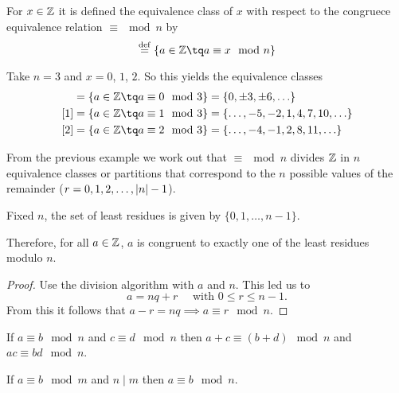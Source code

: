 \begin{defi}
    For $x\in\mathbb{Z}$ it is defined the equivalence class of $x$ with respect to the congruece equivalence
    relation $\equiv \mod n$ by
    \begin{equation}
        [x] \bydef \{a\in\Z\tq a\equiv x\mod n\}
    \end{equation}
\end{defi}

\begin{example}
    Take $n = 3$ and $x = 0$, $1$, $2$. So this yields the equivalence classes
    \begin{align}
        [0] &= \{a\in\Z\tq a\equiv 0\mod 3\} = \{ 0, \pm 3, \pm 6, \ldots\} \\
        [1] &= \{a\in\Z\tq a\equiv 1\mod 3\} = \{\ldots, -5, -2, 1, 4, 7, 10, \ldots\} \\
        [2] &= \{a\in\Z\tq a\equiv 2\mod 3\} = \{\ldots, -4, -1, 2, 8, 11, \ldots\}
    \end{align}
\end{example}

From the previous example we work out that $\equiv\mod n$ divides $\mathbb{Z}$ in $n$ equivalence classes or partitions that correspond to the $n$ possible values of the remainder ($r = 0, 1, 2,\ldots,\left\vert n \right\vert - 1$).

\begin{defi}
    Fixed $n$, the set of least residues is given by $\{0, 1, \ldots, n - 1\} $.
\end{defi}

Therefore, for all $a\in\mathbb{Z}$, $a$ is congruent to exactly one of the least residues modulo $n$.

\begin{proof}
    Use the division algorithm with $a$ and $n$. This led us to
    \begin{equation}
        a = nq + r\quad\textrm{ with } 0\leq r \leq n - 1.
    \end{equation}
    From this it follows that $a - r = nq\implies a\equiv r\mod n$.
\end{proof}

\begin{prop}
    If $a\equiv b\mod n$ and $c\equiv d\mod n$ then $a + c\equiv \left( b + d \right) \mod n$ and $ac\equiv
    bd\mod n$.
\end{prop}

\begin{prop}
    If $a\equiv b\mod m$ and $n\mid m$ then $a\equiv b\mod n$.
\end{prop}

